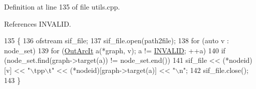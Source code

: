 Definition at line 135 of file utils.\+cpp.



References I\+N\+V\+A\+L\+ID.


\begin{DoxyCode}
135                                                                                                       \{
136     ofstream sif\_file;
137     sif\_file.open(path2file);
138     \textcolor{keywordflow}{for} (\textcolor{keyword}{auto} v : node\_set)
139         \textcolor{keywordflow}{for} (\hyperlink{namespacederegnet_a253cef939ea250e4cc0c967cd0117853}{OutArcIt} a(*graph, v); a != \hyperlink{usinglemon_8h_adf770fe2eec438e3758ffe905dbae208}{INVALID}; ++a)
140             \textcolor{keywordflow}{if} (node\_set.find(graph->target(a)) != node\_set.end())
141                 sif\_file << (*nodeid)[v] << \textcolor{stringliteral}{"\(\backslash\)tpp\(\backslash\)t"} << (*nodeid)[graph->target(a)] << \textcolor{stringliteral}{"\(\backslash\)n"};
142     sif\_file.close();
143 \}
\end{DoxyCode}
